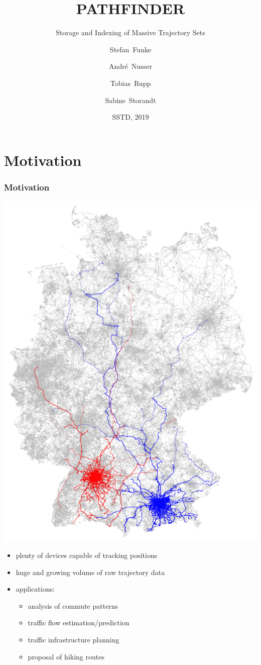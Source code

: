 \documentclass[10pt, t,
aspectratio=1610,%
usenames,
dvipsnames,
]{beamer}
\title[Pathfinder] %
{PATHFINDER}
\subtitle{Storage and Indexing of Massive Trajectory Sets}
\author[Funke, Nusser, Rupp, Storandt] %
{Stefan~Funke\inst{1} \and Andr\'{e}~Nusser\inst{2} \and Tobias~Rupp\inst{3} \and Sabine~Storandt\inst{4}}
\institute[Universities] %
{
	\inst{1}%
	University of Stuttgart
	\and
	\inst{2}%
	Max Planck Institute for Informatics
	\and
	\inst{3}%
	University of Stuttgart
	\and
	\inst{4}%
	University of Konstanz
}
\date[SSTD 2019] %
{SSTD, 2019}
\begin{document}
\frame{\titlepage}

\section{Motivation}
\begin{frame}
	\frametitle{Motivation}
	\begin{minipage}[t]{0.45\textwidth}
		\vspace{0pt}
		\includegraphics[height=0.9\textheight]{images/trajectories.png}
	\end{minipage}
	\hfill
	\begin{minipage}[t]{0.45\textwidth}
		\vspace{0pt}
		\begin{itemize}
			\item<1-> plenty of devices capable of tracking positions
			\item<2-> huge and growing volume of raw trajectory data
			\item<3-> applications:
			      \begin{itemize}
				      \item<4-> analysis of commute patterns
				      \item<5-> traffic flow estimation/prediction
				      \item<6-> traffic infrastructure planning
				      \item<7-> proposal of hiking routes
			      \end{itemize}

		\end{itemize}
	\end{minipage}
\end{frame}
\end{document}
